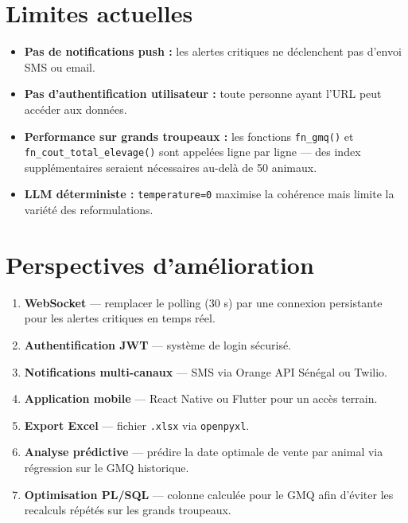 \documentclass[12pt, a4paper, oneside]{report}
\begin{document}
\section{Limites actuelles}

\begin{itemize}[itemsep=4pt]
  \item \textbf{Pas de notifications push :} les alertes critiques ne déclenchent pas
    d'envoi SMS ou email.
  \item \textbf{Pas d'authentification utilisateur :} toute personne ayant l'URL
    peut accéder aux données.
  \item \textbf{Performance sur grands troupeaux :} les fonctions \texttt{fn\_gmq()} et
    \texttt{fn\_cout\_total\_elevage()} sont appelées ligne par ligne — des index
    supplémentaires seraient nécessaires au-delà de 50 animaux.
  \item \textbf{LLM déterministe :} \texttt{temperature=0} maximise la cohérence mais
    limite la variété des reformulations.
\end{itemize}

\section{Perspectives d'amélioration}

\begin{enumerate}[itemsep=4pt]
  \item \textbf{WebSocket} — remplacer le polling (30 s) par une connexion persistante
    pour les alertes critiques en temps réel.
  \item \textbf{Authentification JWT} — système de login sécurisé.
  \item \textbf{Notifications multi-canaux} — SMS via Orange API Sénégal ou Twilio.
  \item \textbf{Application mobile} — React Native ou Flutter pour un accès terrain.
  \item \textbf{Export Excel} — fichier \texttt{.xlsx} via \texttt{openpyxl}.
  \item \textbf{Analyse prédictive} — prédire la date optimale de vente par animal
    via régression sur le GMQ historique.
  \item \textbf{Optimisation PL/SQL} — colonne calculée pour le GMQ afin d'éviter
    les recalculs répétés sur les grands troupeaux.
\end{enumerate}

\newpage
\appendix
\addappheadtotoc
\end{document}
